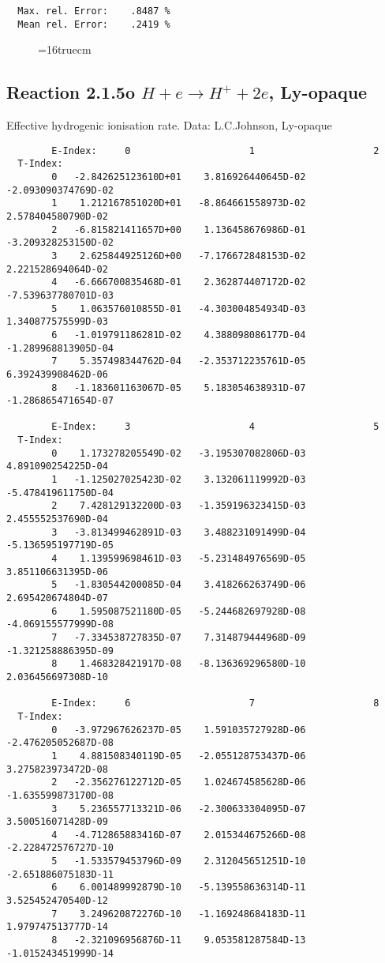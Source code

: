 \documentclass[12pt]{article}
\begin{document}
\begin{small}
\begin{verbatim}
  Max. rel. Error:    .8487 %
  Mean rel. Error:    .2419 %
\end{verbatim}\end{small}
\begin{figure} \label{2.1.5}
\epsfxsize=16truecm
\end{figure}
\newpage

\subsection{
Reaction 2.1.5o  $H + e \rightarrow H^+ + 2e $, Ly-opaque}


   Effective hydrogenic ionisation rate. Data: L.C.Johnson, Ly-opaque

\begin{small}\begin{verbatim}
        E-Index:     0                     1                     2
  T-Index:
        0   -2.842625123610D+01    3.816926440645D-02   -2.093090374769D-02
        1    1.212167851020D+01   -8.864661558973D-02    2.578404580790D-02
        2   -6.815821411657D+00    1.136458676986D-01   -3.209328253150D-02
        3    2.625844925126D+00   -7.176672848153D-02    2.221528694064D-02
        4   -6.666700835468D-01    2.362874407172D-02   -7.539637780701D-03
        5    1.063576010855D-01   -4.303004854934D-03    1.340877575599D-03
        6   -1.019791186281D-02    4.388098086177D-04   -1.289968813905D-04
        7    5.357498344762D-04   -2.353712235761D-05    6.392439908462D-06
        8   -1.183601163067D-05    5.183054638931D-07   -1.286865471654D-07

        E-Index:     3                     4                     5
  T-Index:
        0    1.173278205549D-02   -3.195307082806D-03    4.891090254225D-04
        1   -1.125027025423D-02    3.132061119992D-03   -5.478419611750D-04
        2    7.428129132200D-03   -1.359196323415D-03    2.455552537690D-04
        3   -3.813499462891D-03    3.488231091499D-04   -5.136595197719D-05
        4    1.139599698461D-03   -5.231484976569D-05    3.851106631395D-06
        5   -1.830544200085D-04    3.418266263749D-06    2.695420674804D-07
        6    1.595087521180D-05   -5.244682697928D-08   -4.069155577999D-08
        7   -7.334538727835D-07    7.314879444968D-09   -1.321258886395D-09
        8    1.468328421917D-08   -8.136369296580D-10    2.036456697308D-10

        E-Index:     6                     7                     8
  T-Index:
        0   -3.972967626237D-05    1.591035727928D-06   -2.476205052687D-08
        1    4.881508340119D-05   -2.055128753437D-06    3.275823973472D-08
        2   -2.356276122712D-05    1.024674585628D-06   -1.635599873170D-08
        3    5.236557713321D-06   -2.300633304095D-07    3.500516071428D-09
        4   -4.712865883416D-07    2.015344675266D-08   -2.228472576727D-10
        5   -1.533579453796D-09    2.312045651251D-10   -2.651886075183D-11
        6    6.001489992879D-10   -5.139558636314D-11    3.525452470540D-12
        7    3.249620872276D-10   -1.169248684183D-11    1.979747513777D-14
        8   -2.321096956876D-11    9.053581287584D-13   -1.015243451999D-14


\end{verbatim}
\end{small}
\end{document}
